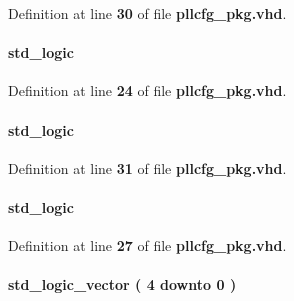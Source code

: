 Definition at line {\bf 30} of file {\bf pllcfg\+\_\+pkg.\+vhd}.

\paragraph[{phcfg\+\_\+start}]{ {\bfseries \textcolor{comment}{std\+\_\+logic}\textcolor{vhdlchar}{ }} \hspace{0.3cm}{\ttfamily [Record]}}\label{classpllcfg__pkg_a58a621fbb541d07569ecd31529813ac6}


Definition at line {\bf 24} of file {\bf pllcfg\+\_\+pkg.\+vhd}.

\paragraph[{phcfg\+\_\+tst}]{ {\bfseries \textcolor{comment}{std\+\_\+logic}\textcolor{vhdlchar}{ }} \hspace{0.3cm}{\ttfamily [Record]}}\label{classpllcfg__pkg_a2763591218a32868ef124f1def7d97ef}


Definition at line {\bf 31} of file {\bf pllcfg\+\_\+pkg.\+vhd}.

\paragraph[{phcfg\+\_\+updn}]{ {\bfseries \textcolor{comment}{std\+\_\+logic}\textcolor{vhdlchar}{ }} \hspace{0.3cm}{\ttfamily [Record]}}\label{classpllcfg__pkg_ad1d948588904c20c3d3d2bfbbd2197bf}


Definition at line {\bf 27} of file {\bf pllcfg\+\_\+pkg.\+vhd}.

\paragraph[{pll\+\_\+ind}]{ {\bfseries \textcolor{comment}{std\+\_\+logic\+\_\+vector}\textcolor{vhdlchar}{ }\textcolor{vhdlchar}{(}\textcolor{vhdlchar}{ }\textcolor{vhdlchar}{ } \textcolor{vhdldigit}{4} \textcolor{vhdlchar}{ }\textcolor{keywordflow}{downto}\textcolor{vhdlchar}{ }\textcolor{vhdlchar}{ } \textcolor{vhdldigit}{0} \textcolor{vhdlchar}{ }\textcolor{vhdlchar}{)}\textcolor{vhdlchar}{ }} \hspace{0.3cm}{\ttfamily [Record]}}\label{classpllcfg__pkg_acd4269bade61d885ca0d25d39e0626f1}


